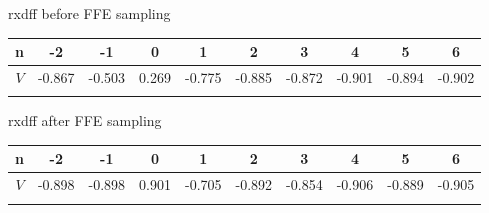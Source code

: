 \documentclass{book}  %
\begin{document}
\begin{paper}
rxdff before FFE sampling
\begin{tabular}{|c|c|c|c|c|c|c|c|c|c|}\hline
	n  &   -2   &   -1   &   0   &    1   &    2   &    3   &    4   &    5   &    6   \\ \hline 
	$V$ & -0.867 & -0.503 & 0.269 & -0.775 & -0.885 & -0.872 & -0.901 & -0.894 & -0.902 \\ \hline 
	\label{table:20G_rxdiff_sample_wo_FFE}
\end{tabular}

rxdff after FFE sampling
\begin{tabular}{|c|c|c|c|c|c|c|c|c|c|}\hline
	n  &   -2   &   -1   &   0   &    1   &    2   &    3   &    4   &    5   &    6   \\ \hline 
	$V$ & -0.898 & -0.898 & 0.901 & -0.705 & -0.892 & -0.854 & -0.906 & -0.889 & -0.905 \\ \hline 
	\label{table:20G_rxdiff_sample_w__FFE}
\end{tabular}


\end{paper}
\end{document}

